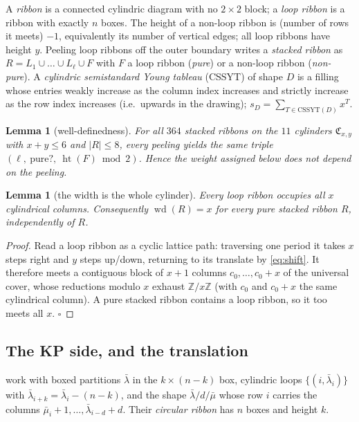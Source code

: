 \documentclass[11pt]{article}
\theoremstyle{plain}
\newtheorem{lemma}[theorem]{Lemma}
\theoremstyle{definition}
\theoremstyle{remark}
\DeclareMathOperator{\hgt}{ht}
\DeclareMathOperator{\wdt}{wd}
\newcommand{\CC}{\mathfrak{C}}
\newcommand{\CSSYT}{\mathrm{CSSYT}}
\newcommand{\bl}{\bar\lambda}
\newcommand{\bm}{\bar\mu}
\begin{document}
A \emph{ribbon} is a connected cylindric diagram with no $2\times2$ block; a \emph{loop ribbon} is a
ribbon with exactly $n$ boxes. The height of a non-loop ribbon is (number of rows it meets) $-1$,
equivalently its number of vertical edges; all loop ribbons have height $y$.
Peeling loop ribbons off the outer boundary writes a \emph{stacked ribbon} as
$R=L_1\cup\dots\cup L_\ell\cup F$ with $F$ a loop ribbon (\emph{pure}) or a non-loop ribbon
(\emph{non-pure}).
A \emph{cylindric semistandard Young tableau} (CSSYT) of shape $D$ is a filling whose entries weakly
increase as the column index increases and strictly increase as the row index increases
(i.e.\ upwards in the drawing); $s_D=\sum_{T\in\CSSYT(D)}x^T$.

\begin{lemma}[well-definedness]\label{lem:welldef}
For all $364$ stacked ribbons on the $11$ cylinders $\CC_{x,y}$ with $x+y\le 6$ and $|R|\le 8$, every
peeling yields the same triple $(\ell,\ \text{pure?},\ \hgt(F)\bmod 2)$. Hence the weight assigned
below does not depend on the peeling.
\end{lemma}

\begin{lemma}[the width is the whole cylinder]\label{lem:width}
Every loop ribbon occupies all $x$ cylindrical columns. Consequently
$\wdt(R)=x$ for every pure stacked ribbon $R$, independently of $R$.
\end{lemma}

\begin{proof}
Read a loop ribbon as a cyclic lattice path: traversing one period it takes $x$ steps right and $y$
steps up/down, returning to its translate by \eqref{eq:shift}. It therefore meets a contiguous block
of $x+1$ columns $c_0,\dots,c_0+x$ of the universal cover, whose reductions modulo $x$ exhaust
$\mathbb{Z}/x\mathbb{Z}$ (with $c_0$ and $c_0+x$ the same cylindrical column). A pure stacked ribbon
contains a loop ribbon, so it too meets all $x$. $\square$
\end{proof}

\subsection{The KP side, and the translation}

\cite{KP} work with boxed partitions $\bl$ in the $k\times(n-k)$ box, cylindric loops
$\{(i,\bl_i)\}$ with $\bl_{i+k}=\bl_i-(n-k)$, and the shape $\bl/d/\bm$ whose row $i$ carries the
columns $\bm_i+1,\dots,\bl_{i-d}+d$. Their \emph{circular ribbon} has $n$ boxes and height $k$.
\end{document}
